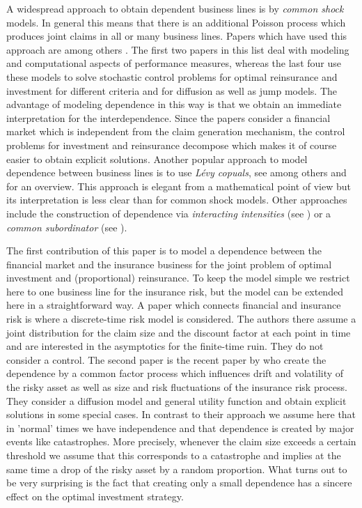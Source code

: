 \documentclass[reqno, 11pt]{amsart}%
\theoremstyle{definition}
\numberwithin{equation}{section} \numberwithin{theorem}{section}
\begin{document}
A widespread approach to obtain dependent business lines is by {\em common shock } models. In general this means that there is an additional Poisson process which produces joint claims in all or many business lines. Papers which have used this  approach are among others \cite{BaeuerleGruebel2005,GBC12,YuenLiangZhou2015,BLX16,BiChen2019,BaeuerleLeimcke2020}. The first two papers in this list deal with modeling and computational aspects of performance measures, whereas the last four use these models to solve stochastic control problems for optimal reinsurance and investment for different criteria and for diffusion as well as jump models. The advantage of modeling dependence in this way is that we obtain an immediate interpretation for the interdependence. Since the papers \cite{YuenLiangZhou2015,BLX16,BiChen2019,BaeuerleLeimcke2020} consider a financial market which is independent from the claim generation mechanism, the control problems for investment and reinsurance decompose which makes it of course easier to obtain explicit solutions. Another popular approach to model dependence between business lines is to use {\em L\'evy copuals}, see among others \cite{bk05,bb11,atwy14} and \cite{acw11} for an overview. This approach is elegant from a mathematical point of view but its interpretation is less clear than for common shock models. Other approaches include the construction of dependence via {\em interacting intensities} (see \cite{BaeuerleGruebel2008}) or a {\em common subordinator} (see \cite{SchererSelch2018}).

The first contribution of this paper is to model a dependence between the financial market and the insurance business for the joint problem of optimal investment and (proportional) reinsurance. To keep the model simple we restrict here to one business line for the insurance risk, but the model can be extended here in a straightforward way. A paper which connects financial and insurance risk is  \cite{Wang2018} where a discrete-time risk model is considered. The authors there assume a joint distribution for the claim size and the discount factor at each point in time and are interested in the asymptotics for the finite-time ruin. They do not consider a control. The second paper is the recent paper by \cite{bs20} who create the dependence by a common factor process which influences drift and volatility of the risky asset as well as size and risk fluctuations of the insurance risk process. They consider a diffusion model and general utility function and obtain explicit solutions in some special cases. In contrast to their approach we assume here that in 'normal' times we have independence and that  dependence is created by major events like catastrophes. More precisely, whenever the claim size exceeds a certain threshold we assume that this corresponds to a catastrophe and implies at the same time a drop of the risky asset by a random proportion. What turns out to be very surprising is the fact that creating only a small dependence has a sincere effect on the optimal investment  strategy.
\end{document}
